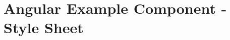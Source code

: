 \begin{appendices}
\begin{figure}[h]
\end{figure}
\newpage

\section{Angular Example Component - Style Sheet}
\label{appendix:component_scss}

\begin{figure}[h]
\end{figure}
\newpage




\end{appendices}
